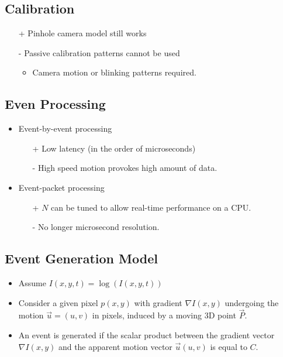 \documentclass[10pt,a4paper]{scrartcl}
\begin{document}
\begin{multicols*}{2}
\subsection{Calibration}

\begin{itemize}
\item[+] Pinhole camera model still works
\item[-] Passive calibration patterns cannot be used
\begin{itemize}
\item Camera motion or blinking patterns required.
\end{itemize}
\end{itemize}

\subsection{Even Processing}

\begin{itemize}
\item Event-by-event processing
\begin{itemize}
\item[+] Low latency (in the order of microseconds)
\item[-] High speed motion provokes high amount of data.
\end{itemize}
\item Event-packet processing
\begin{itemize}
\item[+] $N$ can be tuned to allow real-time performance on a CPU.
\item[-] No longer microsecond resolution.
\end{itemize}
\end{itemize}

\subsection{Event Generation Model}

\begin{itemize}
\item Assume $I(x,y,t) = \log(I(x,y,t))$
\item Consider a given pixel $p(x,y)$ with gradient $\nabla I(x,y)$ undergoing the motion $\vec{u}=(u,v)$ in pixels, induced by a moving 3D point $\vec{P}$.
\item An event is generated if the scalar product between the gradient vector $\nabla I(x,y)$ and the apparent motion vector $\vec{u}(u,v)$ is equal to $C$.
\end{itemize}


\end{multicols*}
\end{document}
